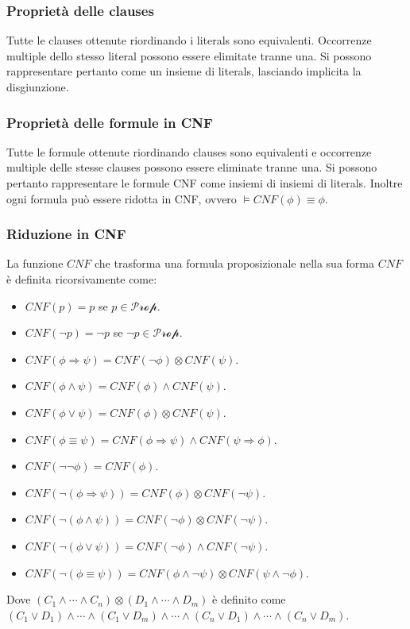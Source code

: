 \subsubsection{Propriet\`a delle clauses}
Tutte le clauses ottenute riordinando i literals sono equivalenti. Occorrenze multiple dello stesso literal possono essere elimitate tranne una. Si possono rappresentare pertanto come un insieme di literals, 
lasciando implicita la disgiunzione.
\subsubsection{Propriet\`a delle formule in CNF}
Tutte le formule ottenute riordinando clauses sono equivalenti e occorrenze multiple delle stesse clauses possono essere eliminate tranne una. Si possono pertanto rappresentare le formule CNF come insiemi
di insiemi di literals. Inoltre ogni formula pu\`o essere ridotta in CNF, ovvero $\models CNF(\phi)\equiv\phi$.
\subsubsection{Riduzione in CNF}
La funzione $CNF$ che trasforma una formula proposizionale nella sua forma $CNF$ \`e definita ricorsivamente come:
\begin{itemize}
\item $CNF(p)=p$ se $p\in\mathcal{Prop}$.
\item $CNF(\neg p)=\neg p$ se $\neg p\in\mathcal{Prop}$.
\item $CNF(\phi\Rightarrow\psi)=CNF(\neg\phi)\otimes CNF(\psi)$.
\item $CNF(\phi\land\psi)=CNF(\phi)\land CNF(\psi)$.
\item $CNF(\phi\lor\psi)=CNF(\phi)\otimes CNF(\psi)$.
\item $CNF(\phi\equiv\psi)=CNF(\phi\Rightarrow\psi)\land CNF(\psi\Rightarrow\phi)$.
\item $CNF(\neg\neg\phi)=CNF(\phi)$.
\item $CNF(\neg(\phi\Rightarrow\psi))=CNF(\phi)\otimes CNF(\neg\psi)$.
\item $CNF(\neg(\phi\land\psi))=CNF(\neg\phi)\otimes CNF(\neg\psi)$.
\item $CNF(\neg(\phi\lor\psi))=CNF(\neg\phi)\land CNF(\neg\psi)$.
\item $CNF(\neg(\phi\equiv\psi))=CNF(\phi\land\neg\psi)\otimes CNF(\psi\land\neg\phi)$.
\end{itemize}
Dove $(C_1\land\cdots\land C_n)\otimes(D_1\land\cdots\land D_m)$ \`e definito come $(C_1\lor D_1)\land\cdots\land(C_1\lor D_m)\land\cdots\land(C_n\lor D_1)\land\cdots\land(C_n\lor D_m)$. 
